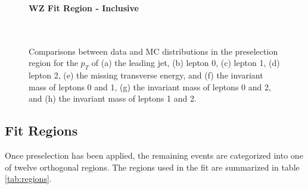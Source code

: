 
\begin{figure}[H]
    \centering
    \textbf{WZ Fit Region - Inclusive}\\
    \\      
    \\
    \caption{Comparisons between data and MC distributions in the preselection region for the $p_T$ of (a) the leading jet, (b) lepton 0, (c) lepton 1, (d) lepton 2, (e) the missing transverse energy, and (f) the invariant mass of leptons 0 and 1, (g) the invariant mass of leptons 0 and 2, and (h) the invariant mass of leptons 1 and 2.}
    \label{kin:inclusive}
\end{figure}

\subsection{Fit Regions}
\label{subsec:regions}

Once preselection has been applied, the remaining events are categorized into one of twelve orthogonal regions. The regions used in the fit are summarized in table \ref{tab:regions}.


